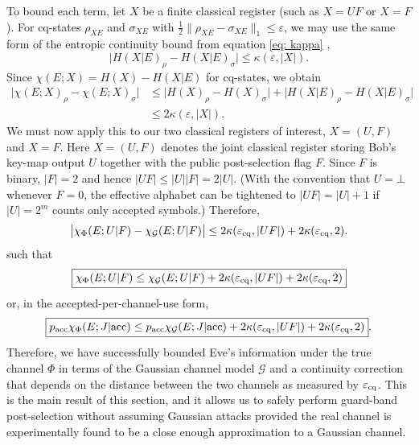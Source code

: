 ﻿\documentclass[12pt]{article}
\begin{document}
To bound each term, let $X$ be a finite classical register (such as $X=UF$ or $X=F$). For cq-states $\rho_{XE}$ and $\sigma_{XE}$ with $\tfrac12\|\rho_{XE}-\sigma_{XE}\|_1\le \varepsilon$, we may use the same form of the entropic continuity bound from equation \eqref{eq: kappa} \cite{Winter-2016},
\begin{equation}
\big|H(X|E)_\rho-H(X|E)_\sigma\big|\le \kappa(\varepsilon, |X|).
\end{equation}
Since $\chi(E;X)=H(X)-H(X|E)$ for cq-states, we obtain
\begin{align}
\label{eq: holevo continuity bound}
  \big|\chi(E;X)_\rho-\chi(E;X)_\sigma\big|
&\le \big|H(X)_\rho-H(X)_\sigma\big|+\big|H(X|E)_\rho-H(X|E)_\sigma\big| \\
&\le 2\kappa(\varepsilon, |X|). \nonumber
\end{align}
We must now apply this to our two classical registers of interest, $X=(U,F)$ and $X=F$. Here $X=(U,F)$ denotes the joint classical register storing Bob's key-map output $U$ together with the public post-selection flag $F$. Since $F$ is binary, $|F|=2$ and hence $|UF|\le |U||F|=2|U|$. (With the convention that $U=\bot$ whenever $F=0$, the effective alphabet can be tightened to $|UF|=|U|+1$ if $|U|=2^m$ counts only accepted symbols.)
Therefore,
\begin{equation}
  \big|\chi_\Phi(E;U|F)-\chi_\mathcal{G}(E;U|F)\big|
  \le
  2\kappa(\varepsilon_{\rm cq}, |UF|)
  +
  2\kappa(\varepsilon_{\rm cq}, 2).
\end{equation}
such that
\begin{equation}
\boxed{
\chi_\Phi(E;U|F)
\le
\chi_\mathcal{G}(E;U|F)
+
2\kappa(\varepsilon_{\rm cq}, |UF|)
+
2\kappa(\varepsilon_{\rm cq}, 2)
}
\end{equation}
or, in the accepted-per-channel-use form,
\begin{equation}
\boxed{
 p_{\rm acc}\chi_\Phi(E;J|{\rm acc})
\le
 p_{\rm acc}\chi_\mathcal{G}(E;J|{\rm acc})
+
2\kappa(\varepsilon_{\rm cq}, |UF|)
+
2\kappa(\varepsilon_{\rm cq}, 2)
}.
\end{equation}
Therefore, we have successfully bounded Eve's information under the true channel $\Phi$ in terms of the Gaussian channel model $\mathcal{G}$ and a continuity correction that depends on the distance between the two channels as measured by $\varepsilon_{\rm cq}$. This is the main result of this section, and it allows us to safely perform guard-band post-selection without assuming Gaussian attacks provided the real channel is experimentally found to be a close enough approximation to a Gaussian channel.
\end{document}
